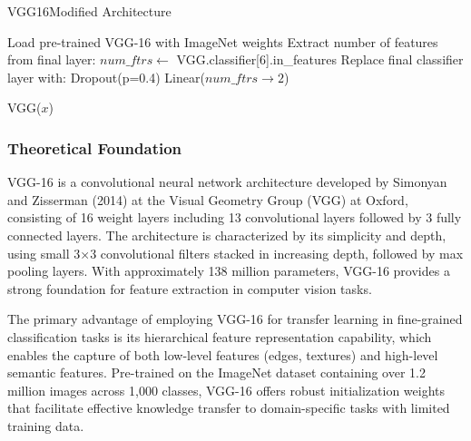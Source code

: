 \documentclass[a4paper,12pt]{report}
\begin{document}


\begin{algorithm}
    \caption{VGG16Modified Architecture}
    \begin{algorithmic}[1]
        \State Load pre-trained VGG-16 with ImageNet weights
        \State Extract number of features from final layer: $num\_ftrs \gets$ VGG.classifier[6].in\_features
        \State Replace final classifier layer with:
            \State Dropout(p=0.4)
            \State Linear($num\_ftrs \to 2$) 
    \EndFunction
    
        \State \Return VGG($x$)
    \EndFunction
    \end{algorithmic}
    \end{algorithm}

\subsubsection{Theoretical Foundation}

VGG-16 is a convolutional neural network architecture developed by Simonyan and Zisserman (2014) at the Visual Geometry Group (VGG) at Oxford, consisting of 16 weight layers including 13 convolutional layers followed by 3 fully connected layers. The architecture is characterized by its simplicity and depth, using small 3×3 convolutional filters stacked in increasing depth, followed by max pooling layers. With approximately 138 million parameters, VGG-16 provides a strong foundation for feature extraction in computer vision tasks.

The primary advantage of employing VGG-16 for transfer learning in fine-grained classification tasks is its hierarchical feature representation capability, which enables the capture of both low-level features (edges, textures) and high-level semantic features. Pre-trained on the ImageNet dataset containing over 1.2 million images across 1,000 classes, VGG-16 offers robust initialization weights that facilitate effective knowledge transfer to domain-specific tasks with limited training data.
\end{document}
